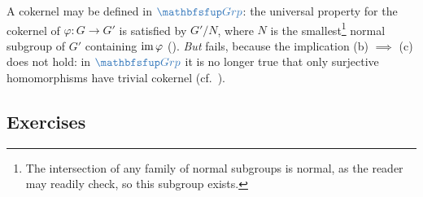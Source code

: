 A cokernel may be defined in $\categ{Grp}$: the universal property for
the cokernel of $\varphi : G \to G'$ is satisfied by $G'/N$, where $N$
is the smallest\footnote{The intersection of any family of normal
  subgroups is normal, as the reader may readily check, so this
  subgroup exists.} normal subgroup of $G'$ containing $\operatorname{im}\varphi$
(). \emph{But}
 fails,
because the implication (b) $\implies$ (c) does not hold: in
$\categ{Grp}$ it is no longer true that only surjective homomorphisms
have trivial cokernel (cf.\
).

\subsection*{Exercises}


